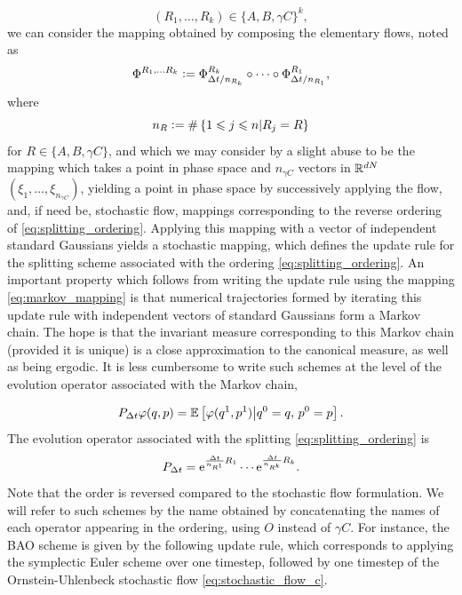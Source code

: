 \begin{equation}\label{eq:splitting_ordering}(R_1,\dots,R_k)\in \{A,B,\gamma C\}^k,\end{equation}
we can consider the mapping obtained by composing the elementary flows, noted as
\begin{equation}\label{eq:markov_mapping}\Phi^{R_1,\dots R_k}\mathrel{\mathop:}=\Phi_{\Delta t/n_{R_k}}^{R_k}\circ\dots\circ\Phi_{\Delta t/n_{R_1}}^{R_1},
\end{equation}
where
$$n_R\mathrel{\mathop:}= \#\left\{1\leqslant j\leqslant n \middle| R_j=R\right\}$$
for $R\in\{A,B,\gamma C\}$, and which we may consider by a slight abuse to be the mapping which takes a point in phase space and $n_{\gamma C}$ vectors in $\mathbb{R}^{dN}$ $(\xi_1,\dots,\xi_{n_{\gamma C}})$, yielding a point in phase space by successively applying the flow, and, if need be, stochastic flow, mappings corresponding to the reverse ordering of \eqref{eq:splitting_ordering}.
Applying this mapping with a vector of independent standard Gaussians yields a stochastic mapping, which defines the update rule for the splitting scheme associated with the ordering \eqref{eq:splitting_ordering}.
An important property which follows from writing the update rule using the mapping \eqref{eq:markov_mapping} is that numerical trajectories formed by iterating this update rule with independent vectors of standard Gaussians form a Markov chain.
The hope is that the invariant measure corresponding to this Markov chain (provided it is unique) is a close approximation to the canonical measure, as well as being ergodic.
It is less cumbersome to write such schemes at the level of the evolution operator associated with the Markov chain,

\begin{equation}
    \label{eq:markov_evolution_operator}
    P_{\Delta t}\varphi (q,p) = \mathbb{E}\left[\varphi(q^1,p^1)\middle|q^0=q,\,p^0=p\right].
\end{equation}
The evolution operator associated with the splitting \eqref{eq:splitting_ordering} is
\begin{equation}
    \label{eq:splitting_semigroup_expr}
    P_{\Delta t}=\mathrm{e}^{\frac{{\Delta t}}{n_{R^1}}R_1}\dotsm\mathrm{e}^{\frac{{\Delta t}}{n_{R^k}}R_k}.
\end{equation}
Note that the order is reversed compared to the stochastic flow formulation.
We will refer to such schemes by the name obtained by concatenating the names of each operator appearing in the ordering, using $O$ instead of $\gamma C$.
For instance, the BAO scheme is given by the following update rule, which corresponds to applying the symplectic Euler scheme over one timestep, followed by one timestep of the Ornstein-Uhlenbeck stochastic flow \eqref{eq:stochastic_flow_c}.

